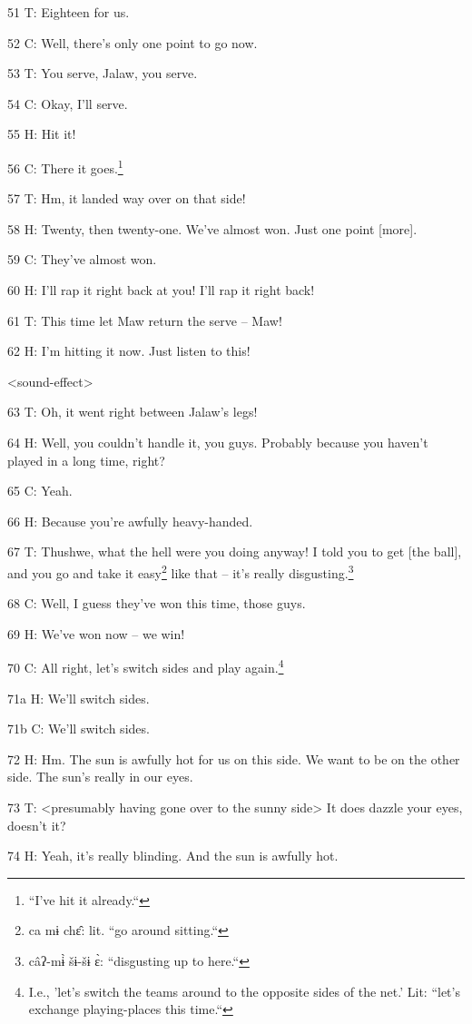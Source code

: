 51 T: Eighteen for us.

52 C: Well, there's only one point to go now.

53 T: You serve, Jalaw, you serve.

54 C: Okay, I'll serve.

55 H: Hit it!

56 C: There it goes.\footnote{``I've hit it already.``}

57 T: Hm, it landed way over on that side!

58 H: Twenty, then twenty-one. We've almost won. Just one point [more].

59 C: They've almost won.

60 H: I'll rap it right back at you! I'll rap it right back!

61 T: This time let Maw return the serve -- Maw!

62 H: I'm hitting it now. Just listen to this!

<sound-effect>

63 T: Oh, it went right between Jalaw's legs!

64 H: Well, you couldn't handle it, you guys. Probably because you haven't played
in a long time, right?

65 C: Yeah.

66 H: Because you're awfully heavy-handed.

67 T: Thushwe, what the hell were you doing anyway! I told you to get [the ball],
and you go and take it easy\footnote{ca mɨ chɛ̂:  lit. ``go around sitting.``} like that -- it's really disgusting.\footnote{câʔ-mɨ̀ šɨ-šɨ ɛ̀: ``disgusting up to here.``}

68 C: Well, I guess they've won this time, those guys.

69 H: We've won now -- we win!

70 C: All right, let's switch sides and play again.\footnote{I.e., 'let's switch the teams around to the opposite sides of the net.' Lit: ``let's exchange playing-places this time.``}

71a H: We'll switch sides.

71b C: We'll switch sides.

72 H: Hm. The sun is awfully hot for us on this side. We want to be on the other
side. The sun's really in our eyes.

73 T: <presumably having gone over to the sunny side> It does
dazzle your eyes, doesn't it?

74 H: Yeah, it's really blinding. And the sun is awfully hot.

